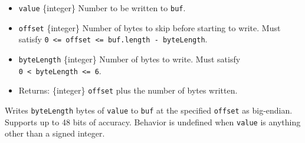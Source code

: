 \begin{itemize}
\tightlist
\item
  \texttt{value} \{integer\} Number to be written to \texttt{buf}.
\item
  \texttt{offset} \{integer\} Number of bytes to skip before starting to
  write. Must satisfy
  \texttt{0\ \textless{}=\ offset\ \textless{}=\ buf.length\ -\ byteLength}.
\item
  \texttt{byteLength} \{integer\} Number of bytes to write. Must satisfy
  \texttt{0\ \textless{}\ byteLength\ \textless{}=\ 6}.
\item
  Returns: \{integer\} \texttt{offset} plus the number of bytes written.
\end{itemize}

Writes \texttt{byteLength} bytes of \texttt{value} to \texttt{buf} at
the specified \texttt{offset} as big-endian. Supports up to 48 bits of
accuracy. Behavior is undefined when \texttt{value} is anything other
than a signed integer.

\begin{Shaded}
\begin{Highlighting}[]
\NormalTok{ \{ }\NormalTok{ \} } \OperatorTok{;}

\OperatorTok{=} \NormalTok{(}\NormalTok{)}\OperatorTok{;}

\NormalTok{(}\OperatorTok{,} \OperatorTok{,} \NormalTok{)}\OperatorTok{;}

\OperatorTok{;}
\end{Highlighting}
\end{Shaded}

\begin{Shaded}
\begin{Highlighting}[]
\NormalTok{ \{ }\NormalTok{ \} }\OperatorTok{=} \NormalTok{(}\NormalTok{)}\OperatorTok{;}

\OperatorTok{=} \NormalTok{(}\NormalTok{)}\OperatorTok{;}

\NormalTok{(}\OperatorTok{,} \OperatorTok{,} \NormalTok{)}\OperatorTok{;}

\OperatorTok{;}
\end{Highlighting}
\end{Shaded}

